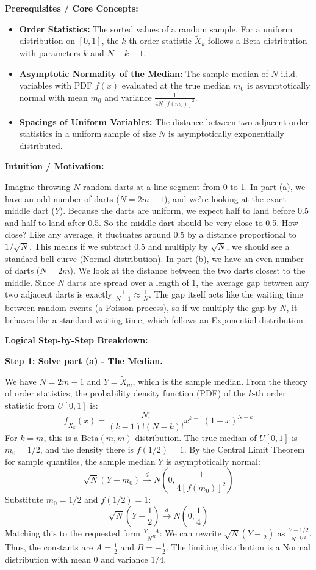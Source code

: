 \begin{solution}
\textbf{Prerequisites / Core Concepts:}
\begin{itemize}
    \item \textbf{Order Statistics:} The sorted values of a random sample. For a uniform distribution on $[0,1]$, the $k$-th order statistic $\tilde{X}_k$ follows a Beta distribution with parameters $k$ and $N-k+1$.
    \item \textbf{Asymptotic Normality of the Median:} The sample median of $N$ i.i.d. variables with PDF $f(x)$ evaluated at the true median $m_0$ is asymptotically normal with mean $m_0$ and variance $\frac{1}{4N[f(m_0)]^2}$.
    \item \textbf{Spacings of Uniform Variables:} The distance between two adjacent order statistics in a uniform sample of size $N$ is asymptotically exponentially distributed.
\end{itemize}

\textbf{Intuition / Motivation:}

Imagine throwing $N$ random darts at a line segment from 0 to 1.
In part (a), we have an odd number of darts ($N=2m-1$), and we're looking at the exact middle dart ($Y$). Because the darts are uniform, we expect half to land before 0.5 and half to land after 0.5. So the middle dart should be very close to 0.5. How close? Like any average, it fluctuates around 0.5 by a distance proportional to $1/\sqrt{N}$. This means if we subtract 0.5 and multiply by $\sqrt{N}$, we should see a standard bell curve (Normal distribution).
In part (b), we have an even number of darts ($N=2m$). We look at the distance between the two darts closest to the middle. Since $N$ darts are spread over a length of 1, the average gap between any two adjacent darts is exactly $\frac{1}{N+1} \approx \frac{1}{N}$. The gap itself acts like the waiting time between random events (a Poisson process), so if we multiply the gap by $N$, it behaves like a standard waiting time, which follows an Exponential distribution.

\textbf{Logical Step-by-Step Breakdown:}

\textbf{Step 1: Solve part (a) - The Median.}

We have $N = 2m - 1$ and $Y = \tilde{X}_m$, which is the sample median.
From the theory of order statistics, the probability density function (PDF) of the $k$-th order statistic from $U[0,1]$ is:
\[ f_{\tilde{X}_k}(x) = \frac{N!}{(k-1)!(N-k)!} x^{k-1} (1-x)^{N-k} \]
For $k=m$, this is a $\text{Beta}(m, m)$ distribution.
The true median of $U[0,1]$ is $m_0 = 1/2$, and the density there is $f(1/2) = 1$.
By the Central Limit Theorem for sample quantiles, the sample median $Y$ is asymptotically normal:
\[ \sqrt{N}(Y - m_0) \xrightarrow{d} N\left(0, \frac{1}{4[f(m_0)]^2}\right) \]
Substitute $m_0 = 1/2$ and $f(1/2) = 1$:
\[ \sqrt{N}\left(Y - \frac{1}{2}\right) \xrightarrow{d} N\left(0, \frac{1}{4}\right) \]
Matching this to the requested form $\frac{Y - A}{N^B}$:
We can rewrite $\sqrt{N}\left(Y - \frac{1}{2}\right)$ as $\frac{Y - 1/2}{N^{-1/2}}$.
Thus, the constants are $A = \frac{1}{2}$ and $B = -\frac{1}{2}$.
The limiting distribution is a Normal distribution with mean 0 and variance $1/4$.


\end{solution}
